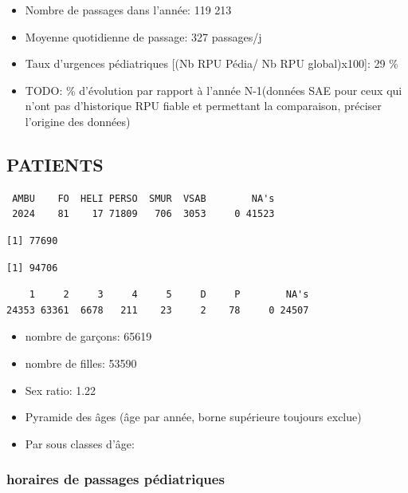 \documentclass[]{article}
\begin{document}
\begin{itemize}
\itemsep1pt\parskip0pt
\item
  Nombre de passages dans l'année: 119 213
\item
  Moyenne quotidienne de passage: 327 passages/j
\item
  Taux d'urgences pédiatriques {[}(Nb RPU Pédia/ Nb RPU global)x100{]}:
  29 \%
\item
  TODO: \% d'évolution par rapport à l'année N-1(données SAE pour ceux
  qui n'ont pas d'historique RPU fiable et permettant la comparaison,
  préciser l'origine des données)
\end{itemize}

\subsection{PATIENTS}\label{patients-1}

\begin{verbatim}
 AMBU    FO  HELI PERSO  SMUR  VSAB        NA's 
 2024    81    17 71809   706  3053     0 41523 
\end{verbatim}

\begin{verbatim}
[1] 77690
\end{verbatim}

\begin{verbatim}
[1] 94706
\end{verbatim}

\begin{verbatim}
    1     2     3     4     5     D     P        NA's 
24353 63361  6678   211    23     2    78     0 24507 
\end{verbatim}

\begin{itemize}
\itemsep1pt\parskip0pt
\item
  nombre de garçons: 65619
\item
  nombre de filles: 53590
\item
  Sex ratio: 1.22
\item
  Pyramide des âges (âge par année, borne supérieure toujours exclue)
\item
  Par sous classes d'âge:
\end{itemize}

\subsubsection{horaires de passages
pédiatriques}\label{horaires-de-passages-pediatriques}
\end{document}

